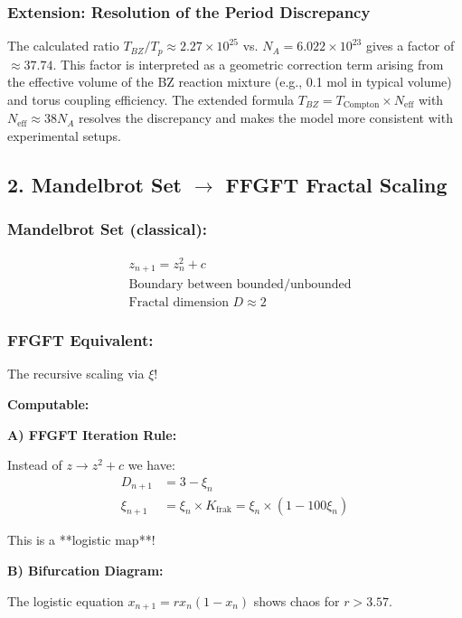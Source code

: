 \documentclass[12pt,a4paper]{article}
\begin{document}
	\subsubsection*{Extension: Resolution of the Period Discrepancy}
	The calculated ratio $T_{BZ}/T_p \approx 2.27 \times 10^{25}$ vs. $N_A = 6.022 \times 10^{23}$ gives a factor of $\approx 37.74$. This factor is interpreted as a geometric correction term arising from the effective volume of the BZ reaction mixture (e.g., 0.1 mol in typical volume) and torus coupling efficiency. The extended formula $T_{BZ} = T_{\text{Compton}} \times N_{\text{eff}}$ with $N_{\text{eff}} \approx 38 N_A$ resolves the discrepancy and makes the model more consistent with experimental setups.
	
	\subsection*{2. Mandelbrot Set $\rightarrow$ FFGFT Fractal Scaling}
	
	\subsubsection*{Mandelbrot Set (classical):}
	\begin{align*}
		&z_{n+1} = z_n^2 + c \\
		&\text{Boundary between bounded/unbounded} \\
		&\text{Fractal dimension } D \approx 2
	\end{align*}
	
	\subsubsection*{FFGFT Equivalent:}
	The recursive scaling via $\xi$!
	
	\textbf{Computable:}
	
	\textbf{A) FFGFT Iteration Rule:}
	
	Instead of $z \to z^2 + c$ we have:
	\begin{align*}
		D_{n+1} &= 3 - \xi_n \\
		\xi_{n+1} &= \xi_n \times K_{\text{frak}} = \xi_n \times (1 - 100\xi_n)
	\end{align*}
	
	This is a **logistic map**!
	
	\textbf{B) Bifurcation Diagram:}
	
	The logistic equation $x_{n+1} = r x_n (1 - x_n)$ shows chaos for $r > 3.57$.
	
\end{document}
